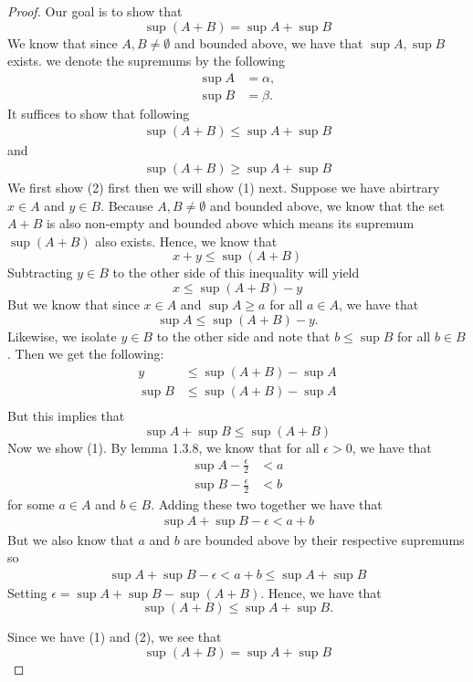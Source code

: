 \begin{proof}
Our goal is to show that 
\[ 
\sup(A+B) = \sup A + \sup B     
\]
We know that since \( A,B \neq \emptyset \) and bounded above, we have that \( \sup A, \sup B \) exists. we denote the supremums by the following 
\begin{align*}
    \sup A &= \alpha, \\ 
    \sup B &= \beta.
\end{align*}
It suffices to show that following 
\begin{align}
    \sup(A+B) \leq \sup A + \sup B     
\end{align}
and 
\begin{align}
    \sup(A+B) \geq \sup A + \sup B
\end{align}
We first show (2) first then we will show (1) next. Suppose we have abirtrary \( x \in A \) and \( y \in B \). Because \( A, B \neq \emptyset \) and bounded above, we know that the set \(A + B  \) is also non-empty and bounded above which means its supremum \( \sup(A + B) \) also exists. Hence, we know that 
\[
    x + y \leq \sup(A+B)    
\] 
Subtracting \( y \in B \) to the other side of this inequality will yield
\[ 
    x \leq \sup(A + B) - y     
\]
But we know that since \( x \in A \) and \( \sup A \geq a \) for all \( a \in A \), we have that 
\[ 
  \sup A \leq \sup(A+B) - y.   
\]
Likewise, we isolate \( y \in B \) to the other side and note that \( b \leq \sup B \) for all \( b \in B \). Then we get the following:
\begin{align*}
    y &\leq \sup(A+B) - \sup A  \\
    \sup B &\leq \sup(A+B) - \sup A  \\
\end{align*}
But this implies that 
\[ 
    \sup A + \sup B \leq \sup(A+B)     
\]
Now we show (1). By lemma 1.3.8, we know that for all \( \epsilon > 0 \), we have that 
\begin{align*}
    \sup A - \frac{\epsilon }{2} &< a \\
    \sup B - \frac{\epsilon }{2} &< b
\end{align*}
for some \( a \in A \) and \( b \in B \). Adding these two together we have that 
\begin{align*}
    \sup A + \sup B - \epsilon < a + b 
\end{align*}
But we also know that \( a \) and \( b \) are bounded above by their respective supremums so 
\begin{align*}
    \sup A + \sup B - \epsilon < a + b \leq \sup A + \sup B
\end{align*}
Setting \( \epsilon = \sup A+\sup B-\sup(A +B) \). Hence, we have that 
\[
    \sup(A+B) \leq \sup A + \sup B.    
\]

Since we have (1) and (2), we see that 
\[ 
    \sup(A+B) = \sup A + \sup B
\]

\end{proof}



